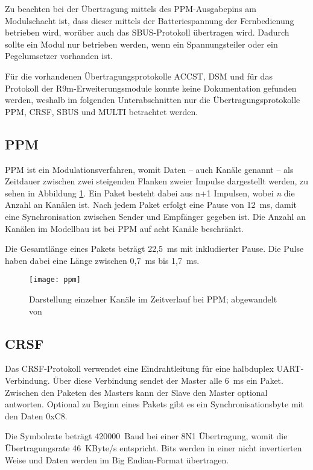 Zu beachten bei der Übertragung mittels des PPM-Ausgabepins am Modulschacht ist, dass dieser mittels der Batteriespannung der Fernbedienung betrieben wird, worüber auch das SBUS-Protokoll übertragen wird. Dadurch sollte ein Modul nur betrieben werden, wenn ein Spannungsteiler oder ein Pegelumsetzer vorhanden ist. \cite{opentxFAQ}

Für die vorhandenen Übertragungsprotokolle ACCST, DSM und für das Protokoll der R9m-Erweiterungsmodule konnte keine Dokumentation gefunden werden, weshalb im folgenden Unterabschnitten nur die Übertragungsprotokolle \ac{PPM}, CRSF, SBUS und MULTI betrachtet werden.

\subsection{\acf{PPM}}
\ac{PPM} ist ein Modulationsverfahren, womit Daten -- auch Kanäle genannt -- als Zeitdauer zwischen zwei steigenden Flanken zweier Impulse dargestellt werden, zu sehen in Abbildung \ref{fig:ppmtime}. Ein Paket besteht dabei aus n+1 Impulsen, wobei \textit{n} die Anzahl an Kanälen ist. Nach jedem Paket erfolgt eine Pause von 12~ms, damit eine Synchronisation zwischen Sender und Empfänger gegeben ist. Die Anzahl an Kanälen im Modellbau ist bei \ac{PPM} auf acht Kanäle beschränkt. \cite{hornppm}

Die Gesamtlänge eines Pakets beträgt 22,5~ms mit inkludierter Pause. Die Pulse haben dabei eine Länge zwischen 0,7~ms bis 1,7~ms. \cite{opentxppm}

\begin{figure}[h]
    \centering
    \texttt{[image: ppm]}
    \caption{Darstellung einzelner Kanäle im Zeitverlauf bei \acs{PPM}; abgewandelt von \cite{hornppm}}
    \label{fig:ppmtime}
\end{figure}

\subsection{CRSF}
Das CRSF-Protokoll verwendet eine Eindrahtleitung für eine halbduplex \ac{UART}-Verbindung. Über diese Verbindung sendet der Master alle 6~ms ein Paket. Zwischen den Paketen des Masters kann der Slave den Master optional antworten. Optional zu Beginn eines Pakets gibt es ein Synchronisationsbyte mit den Daten 0xC8. \cites{cleanflightCrsf}{cleanflightCrsfP}

Die Symbolrate beträgt 420000~Baud bei einer 8N1 Übertragung, womit die Übertragungsrate 46~KByte/s entspricht. Bits werden in einer nicht invertierten Weise und Daten werden im Big Endian-Format übertragen. \cite{cleanflightCrsf}

